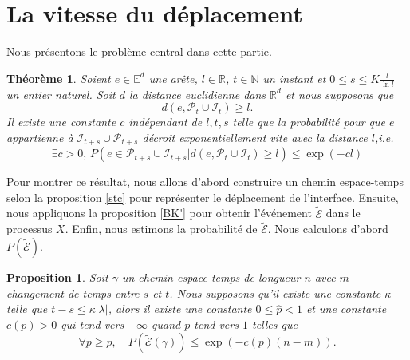 \documentclass[titlepage,a4paper,12pt]{article}
\newcounter{th}
\newcounter{propo}
\newtheorem{thm}[th]{Théorème}
\newtheorem{prop}[propo]{Proposition}
\begin{document}
\section{La vitesse du déplacement}
Nous présentons le problème central dans cette partie. 
\begin{thm}
Soient $e\in \mathbb{E}^d$ une arête, $l\in \mathbb{R}$, $t\in \mathbb{N}$ un instant et $\displaystyle 0\leqslant s\leqslant K\frac{l}{\ln l}$ un entier naturel. Soit $d$ la distance euclidienne dans $\mathbb{R}^d$ et nous supposons que $$d(e,\mathcal{P}_t\cup \mathcal{I}_t) \geqslant l.$$ Il existe une constante $c$ indépendant de $l,t,s$ telle que la probabilité pour que $e$ appartienne à $\mathcal{I}_{t+s}\cup \mathcal{P}_{t+s}$ décroît exponentiellement vite avec la distance $l$,i.e. 
\begin{equation}
\exists c > 0,\, P(e\in \mathcal{P}_{t+s}\cup \mathcal{I}_{t+s}|d(e,\mathcal{P}_t\cup \mathcal{I}_t) \geqslant l)\leqslant \exp(-cl)
\end{equation}
\end{thm}
Pour montrer ce résultat, nous allons d'abord construire un chemin espace-temps selon la proposition \ref{stc} pour représenter le déplacement de l'interface. Ensuite, nous appliquons la proposition \ref{BK'} pour obtenir l'événement $\tilde{\mathcal{E}}$ dans le processus $X$. Enfin, nous estimons la probabilité de $\tilde{\mathcal{E}}$. Nous calculons d'abord $P(\tilde{\mathcal{E}})$.
\begin{prop} \label{decexp}
Soit $\gamma$ un chemin espace-temps de longueur $n$ avec $m$ changement de temps entre $s$ et $t$. Nous supposons qu'il existe une constante $\kappa$ telle que $t-s \leqslant \kappa |\lambda|$, alors il existe une constante $0\leqslant\hat{p}< 1$ et une constante $c(p)>0$ qui tend vers $+\infty$ quand $p$ tend vers $1$ telles que $$\forall p \geqslant \hat{p}, \quad P(\tilde{\mathcal{E}}(\gamma))\leqslant \exp(-c(p)(n-m)).$$
\end{prop}
\end{document}
